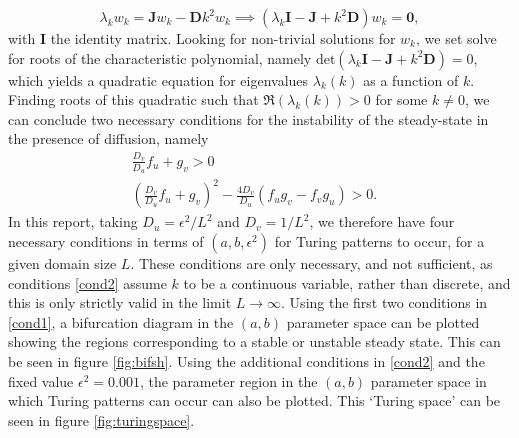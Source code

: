 $$
\lambda_k w_k=\textbf{J}w_k-\textbf{D}k^2w_k \implies (\lambda_k \textbf{I}-\textbf{J}+k^2\textbf{D})w_k=\textbf{0},
$$
with $\textbf{I}$ the identity matrix. Looking for non-trivial solutions for $w_k$, we set solve for roots of the characteristic polynomial, namely $\text{det}(\lambda_k \textbf{I}-\textbf{J}+k^2\textbf{D})=0$, which yields a quadratic equation for eigenvalues $\lambda_k(k)$ as a function of $k$. Finding roots of this quadratic such that $\Re(\lambda_k(k))>0$ for some $k\neq0$, we can conclude two necessary conditions for the instability of the steady-state in the presence of diffusion, namely
\begin{equation}\label{cond2}
    \begin{split}
    \frac{D_v}{D_u}f_u+g_v>0&\\
    \left(\frac{D_v}{D_u}f_u+g_v\right)^2-\frac{4D_v}{D_u}(f_ug_v-f_vg_u)>0.
\end{split}
\end{equation}
In this report, taking $D_u=\epsilon^2/L^2$ and $D_v=1/L^2$, we therefore have four necessary conditions in terms of $(a,b,\epsilon^2)$ for Turing patterns to occur, for a given domain size $L$. These conditions are only necessary, and not sufficient, as conditions \eqref{cond2} assume $k$ to be a continuous variable, rather than discrete, and this is only strictly valid in the limit $L\to\infty$. Using the first two conditions in \eqref{cond1}, a bifurcation diagram in the $(a,b)$ parameter space can be plotted showing the regions corresponding to a stable or unstable steady state. This can be seen in figure \ref{fig:bifsh}. Using the additional conditions in \eqref{cond2} and the fixed value $\epsilon^2=0.001$, the parameter region in the $(a,b)$ parameter space in which Turing patterns can occur can also be plotted. This `Turing space' can be seen in figure \ref{fig:turingspace}.

